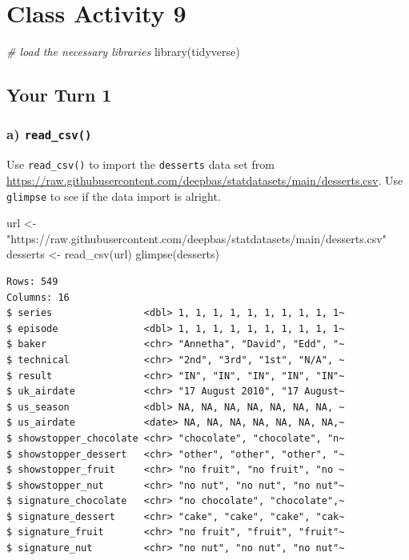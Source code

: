 \documentclass[
]{book}
\newenvironment{Shaded}{\begin{snugshade}}{\end{snugshade}}
\newcommand{\CommentTok}[1]{\textcolor[rgb]{0.56,0.35,0.01}{\textit{#1}}}
\newcommand{\FunctionTok}[1]{\textcolor[rgb]{0.00,0.00,0.00}{#1}}
\newcommand{\NormalTok}[1]{#1}
\newcommand{\OtherTok}[1]{\textcolor[rgb]{0.56,0.35,0.01}{#1}}
\newcommand{\StringTok}[1]{\textcolor[rgb]{0.31,0.60,0.02}{#1}}
\begin{document}
\hypertarget{class-activity-9}{%
\chapter{Class Activity 9}\label{class-activity-9}}

\begin{Shaded}
\begin{Highlighting}[]
\CommentTok{\# load the necessary libraries}
\FunctionTok{library}\NormalTok{(tidyverse)}
\end{Highlighting}
\end{Shaded}

\hypertarget{your-turn-1-2}{%
\section{Your Turn 1}\label{your-turn-1-2}}

\hypertarget{a-read_csv}{%
\subsection{\texorpdfstring{a) \texttt{read\_csv()}}{a) read\_csv()}}\label{a-read_csv}}

Use \texttt{read\_csv()} to import the \texttt{desserts} data set from \url{https://raw.githubusercontent.com/deepbas/statdatasets/main/desserts.csv}. Use \texttt{glimpse} to see if the data import is alright.

\begin{Shaded}
\begin{Highlighting}[]
\NormalTok{url }\OtherTok{\textless{}{-}} \StringTok{"https://raw.githubusercontent.com/deepbas/statdatasets/main/desserts.csv"}
\NormalTok{desserts }\OtherTok{\textless{}{-}} \FunctionTok{read\_csv}\NormalTok{(url)}
\FunctionTok{glimpse}\NormalTok{(desserts)}
\end{Highlighting}
\end{Shaded}

\begin{verbatim}
Rows: 549
Columns: 16
$ series                <dbl> 1, 1, 1, 1, 1, 1, 1, 1, 1, 1~
$ episode               <dbl> 1, 1, 1, 1, 1, 1, 1, 1, 1, 1~
$ baker                 <chr> "Annetha", "David", "Edd", "~
$ technical             <chr> "2nd", "3rd", "1st", "N/A", ~
$ result                <chr> "IN", "IN", "IN", "IN", "IN"~
$ uk_airdate            <chr> "17 August 2010", "17 August~
$ us_season             <dbl> NA, NA, NA, NA, NA, NA, NA, ~
$ us_airdate            <date> NA, NA, NA, NA, NA, NA, NA,~
$ showstopper_chocolate <chr> "chocolate", "chocolate", "n~
$ showstopper_dessert   <chr> "other", "other", "other", "~
$ showstopper_fruit     <chr> "no fruit", "no fruit", "no ~
$ showstopper_nut       <chr> "no nut", "no nut", "no nut"~
$ signature_chocolate   <chr> "no chocolate", "chocolate",~
$ signature_dessert     <chr> "cake", "cake", "cake", "cak~
$ signature_fruit       <chr> "no fruit", "fruit", "fruit"~
$ signature_nut         <chr> "no nut", "no nut", "no nut"~
\end{verbatim}
\end{document}
